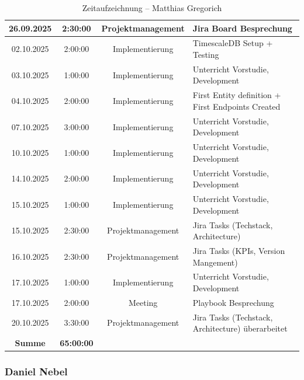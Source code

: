 \documentclass{article}
\begin{document}
\begin{table}[H]
\begin{tabularx}{\textwidth}{|c|c|c|X|}
    26.09.2025 & 2:30:00 & Projektmanagement & Jira Board Besprechung \\ \hline
    02.10.2025 & 2:00:00 & Implementierung   & TimescaleDB Setup + Testing \\ \hline
    03.10.2025 & 1:00:00 & Implementierung   & Unterricht Vorstudie, Development \\ \hline
    04.10.2025 & 2:00:00 & Implementierung   & First Entity definition + First Endpoints Created \\ \hline
    07.10.2025 & 3:00:00 & Implementierung   & Unterricht Vorstudie, Development \\ \hline
    10.10.2025 & 1:00:00 & Implementierung   & Unterricht Vorstudie, Development \\ \hline
    14.10.2025 & 2:00:00 & Implementierung   & Unterricht Vorstudie, Development \\ \hline
    15.10.2025 & 1:00:00 & Implementierung   & Unterricht Vorstudie, Development \\ \hline
    15.10.2025 & 2:30:00 & Projektmanagement & Jira Tasks (Techstack, Architecture) \\ \hline
    16.10.2025 & 2:30:00 & Projektmanagement & Jira Tasks (KPIs, Version Mangement) \\ \hline
    17.10.2025 & 1:00:00 & Implementierung   & Unterricht Vorstudie, Development \\ \hline
    17.10.2025 & 2:00:00 & Meeting           & Playbook Besprechung \\ \hline
    20.10.2025 & 3:30:00 & Projektmanagement & Jira Tasks (Techstack, Architecture) überarbeitet \\ \hline
    \rowcolor{black!10}\textbf{Summe} & \textbf{65:00:00} & & \\ \hline
  \end{tabularx}
  \caption{Zeitaufzeichnung – Matthias Gregorich}
  \label{tab:zeit-matthias}
\end{table}



\subsubsection*{Daniel Nebel}
\end{document}
